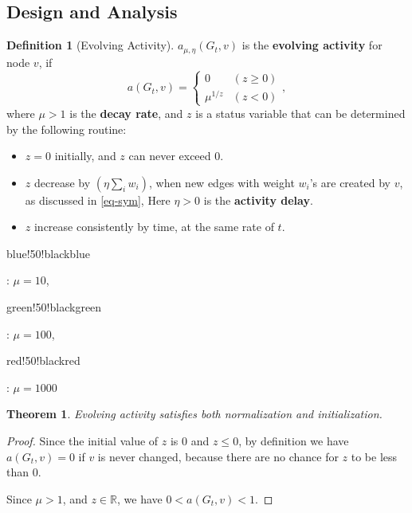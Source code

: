 \documentclass[12pt,abstract=true]{scrartcl}
\numberwithin{equation}{section}
\theoremstyle{definition}   \newtheorem{definition}{Definition}[section]
\theoremstyle{plain}        \newtheorem{theorem}{Theorem}[section]
\theoremstyle{plain}        \newtheorem{observation}{Observation}[section]
\theoremstyle{plain}        \newtheorem{fact}{Fact}[section]
\theoremstyle{plain}        \newtheorem{claim}{Claim}[section]
\theoremstyle{plain}        \newtheorem{lemma}[theorem]{Lemma}
\theoremstyle{plain}        \newtheorem{corollary}[theorem]{Corollary}
\theoremstyle{remark}       \newtheorem{example}{Example}[section]
\theoremstyle{remark}       \newtheorem{remark}{Remark}[section]
\begin{document}
\subsection{Design and Analysis}

\begin{definition}[Evolving Activity]
$a_{\mu,\eta}(G_t,v)$ is the \textbf{evolving activity} for node $v$, if
\begin{equation}
a(G_t,v)=\begin{cases}
0& (z\geq 0)\\
\mu^{1/z} & (z<0)
\end{cases},
\end{equation}
where $\mu>1$ is the \textbf{decay rate}, and $z$ is a status variable that can
be determined by the following routine:
\begin{itemize}
\item $z=0$ initially, and $z$ can never exceed $0$.
\item $z$ decrease by $\left(\eta\sum_i w_i\right)$, when new edges with weight
$w_i$'s are created by $v$, as discussed in \eqref{eq-sym}, Here $\eta>0$ is the
\textbf{activity delay}.
\item $z$ increase consistently by time, at the same rate of $t$.
\end{itemize}
\end{definition}

\begin{center} 

\begin{color}{blue!50!black}blue
\end{color}: $\mu=10$,
\begin{color}{green!50!black}green
\end{color}: $\mu=100$,
\begin{color}{red!50!black}red
\end{color}: $\mu=1000$\end{center}

\begin{theorem}
Evolving activity satisfies both normalization and initialization.
\end{theorem}
\begin{proof}
Since the initial value of $z$ is $0$ and $z\leq 0$, by definition we have
$a(G_t,v)=0$ if $v$ is never changed, because there are no chance for $z$
to be less than $0$.

Since $\mu>1$, and $z\in\mathbb{R}$, we have $0<a(G_t,v)<1$.
\end{proof}
\end{document}
